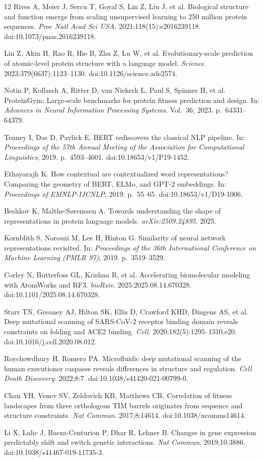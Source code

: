 \documentclass[11pt]{article}
\begin{document}
\begin{thebibliography}{12}
Rives A, Meier J, Sercu T, Goyal S, Lin Z, Liu J, et al.
Biological structure and function emerge from scaling unsupervised learning to 250 million
protein sequences. \emph{Proc Natl Acad Sci USA}. 2021;118(15):e2016239118.
doi:10.1073/pnas.2016239118.

Lin Z, Akin H, Rao R, Hie B, Zhu Z, Lu W, et al.
Evolutionary-scale prediction of atomic-level protein structure with a language model.
\emph{Science}. 2023;379(6637):1123--1130. doi:10.1126/science.ade2574.

Notin P, Kollasch A, Ritter D, van Niekerk L, Paul S, Spinner H, et al.
ProteinGym: Large-scale benchmarks for protein fitness prediction and design.
In: \emph{Advances in Neural Information Processing Systems}. Vol.~36; 2023. p.~64331--64379.

Tenney I, Das D, Pavlick E.
BERT rediscovers the classical NLP pipeline.
In: \emph{Proceedings of the 57th Annual Meeting of the Association for Computational
Linguistics}; 2019. p.~4593--4601. doi:10.18653/v1/P19-1452.

Ethayarajh K.
How contextual are contextualized word representations? Comparing the geometry of BERT,
ELMo, and GPT-2 embeddings.
In: \emph{Proceedings of EMNLP-IJCNLP}; 2019. p.~55--65. doi:10.18653/v1/D19-1006.

Beshkov K, Malthe-S{\o}renssen A.
Towards understanding the shape of representations in protein language models.
\emph{arXiv:2509.24895}. 2025.

Kornblith S, Norouzi M, Lee H, Hinton G.
Similarity of neural network representations revisited.
In: \emph{Proceedings of the 36th International Conference on Machine Learning (PMLR 97)};
2019. p.~3519--3529.

Corley N, Butterfoss GL, Krishna R, et al.
Accelerating biomolecular modeling with AtomWorks and RF3.
\emph{bioRxiv}. 2025:2025.08.14.670328. doi:10.1101/2025.08.14.670328.

Starr TN, Greaney AJ, Hilton SK, Ellis D, Crawford KHD, Dingens AS, et al.
Deep mutational scanning of SARS-CoV-2 receptor binding domain reveals constraints on
folding and ACE2 binding. \emph{Cell}. 2020;182(5):1295--1310.e20.
doi:10.1016/j.cell.2020.08.012.

Roychowdhury H, Romero PA.
Microfluidic deep mutational scanning of the human executioner caspases reveals differences
in structure and regulation. \emph{Cell Death Discovery}. 2022;8:7.
doi:10.1038/s41420-021-00799-0.

Chan YH, Venev SV, Zeldovich KB, Matthews CR.
Correlation of fitness landscapes from three orthologous TIM barrels originates from
sequence and structure constraints. \emph{Nat Commun}. 2017;8:14614.
doi:10.1038/ncomms14614.

Li X, Lalic J, Baeza-Centurion P, Dhar R, Lehner B.
Changes in gene expression predictably shift and switch genetic interactions.
\emph{Nat Commun}. 2019;10:3886. doi:10.1038/s41467-019-11735-3.
\end{thebibliography}
\end{document}
